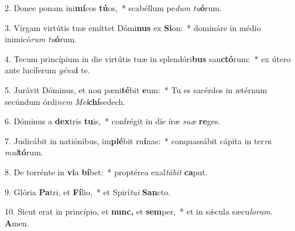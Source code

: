 \item 2. Donec ponam ini\textbf{mí}cos \textbf{tú}os,~* scabéllum pe\hspace{0.03em}\textit{dum} \textit{tu}\textbf{ó}rum.

\item 3. Vírgam virtútis tuæ emíttet Dómi\textbf{nus} ex \textbf{Si}on:~* domináre in médio inimicó\textit{rum} \textit{tu}\textbf{ó}rum.

\item 4. Tecum princípium in die virtútis tuæ in splendóri\textbf{bus} san\textbf{ctó}rum:~* ex útero ante lucíferum \textit{génu}\textbf{i} te.

\item 5. Jurávit Dóminus, et non pæni\textbf{té}bit \textbf{e}um:~* Tu es sacérdos in ætérnum secúndum órdi\textit{nem} \textit{Mel}\textbf{chí}sedech.

\item 6. Dóminus a \textbf{dex}tris \textbf{tu}is,~* confrégit in díe íræ \textit{suæ} \textbf{re}ges.

\item 7. Judicábit in natiónibus, im\textbf{plé}bit ru\textbf{í}nas:~* conquassábit cápita in ter\textit{ra} \textit{mul}\textbf{tó}rum.

\item 8. De torrénte in \textbf{vi}a \textbf{bí}bet:~* proptérea exal\textit{tábit} \textbf{ca}put.

\item 9. Glória \textbf{Pa}tri, et \textbf{Fí}lio,~* et Spirí\hspace{0.03em}\textit{tui} \textbf{San}cto.

\item 10. Sicut erat in princípio, et \textbf{nunc,} et \textbf{sem}per,~* et in sǽcula sæcu\hspace{0.03em}\textit{lorum.} \textbf{A}men.
